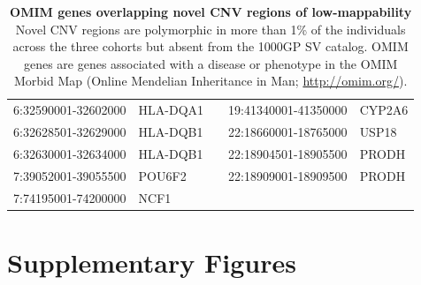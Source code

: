 \begin{table}[htp]
{\begin{tabular}{|l|l|l|l|l|}
      \cline{1-2}\cline{4-5}                                       
      6:32590001-32602000   & HLA-DQA1  && 19:41340001-41350000   & CYP2A6    \\
      \cline{1-2}\cline{4-5}                                       
      6:32628501-32629000   & HLA-DQB1  && 22:18660001-18765000   & USP18     \\
      \cline{4-5}                                       
      6:32630001-32634000   & HLA-DQB1  && 22:18904501-18905500   & PRODH     \\
      \cline{1-2}
      7:39052001-39055500   & POU6F2    && 22:18909001-18909500   & PRODH     \\
      \cline{1-2}\cline{4-5}                                       
      7:74195001-74200000   & NCF1      &       \multicolumn{3}{c}{}        \\
      \cline{1-2}
    \end{tabular}
  }
  \caption[OMIM genes overlapping novel CNV regions of low-mappability]{{\bf OMIM genes overlapping novel CNV regions of low-mappability} {\small Novel CNV regions are polymorphic in more than 1\% of the individuals across the three cohorts but absent from the 1000GP SV catalog\cite{Sudmant2015a}. OMIM genes are genes associated with a disease or phenotype in the OMIM Morbid Map (Online Mendelian Inheritance in Man; \url{http://omim.org/}).}}
  \label{tab:omimgenes}
\end{table}


\clearpage

\section*{Supplementary Figures}

